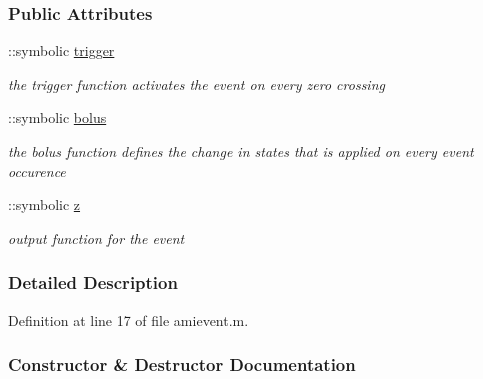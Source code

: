 \subsubsection*{Public Attributes}
\begin{DoxyCompactItemize}
\item 
\hypertarget{classamievent_ae194cb817eae4085f8023885100c68dd}{}\+::symbolic \hyperlink{classamievent_ae194cb817eae4085f8023885100c68dd}{trigger}\label{classamievent_ae194cb817eae4085f8023885100c68dd}

\begin{DoxyCompactList}\small\item\em the trigger function activates the event on every zero crossing \end{DoxyCompactList}\item 
\hypertarget{classamievent_ab9227561ac246ee4b70f9e65c25ffda7}{}\+::symbolic \hyperlink{classamievent_ab9227561ac246ee4b70f9e65c25ffda7}{bolus}\label{classamievent_ab9227561ac246ee4b70f9e65c25ffda7}

\begin{DoxyCompactList}\small\item\em the bolus function defines the change in states that is applied on every event occurence \end{DoxyCompactList}\item 
\hypertarget{classamievent_a25ed1bcb423b0b7200f485fc5ff71c8e}{}\+::symbolic \hyperlink{classamievent_a25ed1bcb423b0b7200f485fc5ff71c8e}{z}\label{classamievent_a25ed1bcb423b0b7200f485fc5ff71c8e}

\begin{DoxyCompactList}\small\item\em output function for the event \end{DoxyCompactList}\end{DoxyCompactItemize}


\subsubsection{Detailed Description}


Definition at line 17 of file amievent.\+m.



\subsubsection{Constructor \& Destructor Documentation}
\hypertarget{classamievent_aa89b0efd53c33a18acf04c1dda76842c}{}
